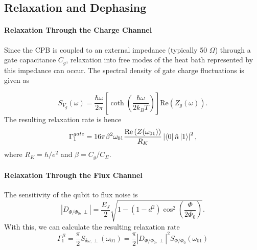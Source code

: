 \subsection{Relaxation and Dephasing}

\paragraph{Relaxation Through the Charge Channel}

Since the CPB is coupled to an external impedance (typically 50 $\Omega$) through a gate capacitance $C_g$, relaxation into free modes of the heat bath represented by this impedance can occur. The spectral density of gate charge fluctuations is given as

%
\begin{equation}
S_{V_g}(\omega) = \frac{\hbar\omega}{2\pi}\left[\coth{\left(\frac{\hbar \omega}{2 k_B T}\right)}\right]\mathrm{Re}\left(Z_g(\omega)\right).
\end{equation}
%
The resulting relaxation rate is hence
%
\begin{equation}
\Gamma_1^{gate} = 16\pi\beta^2 \omega_{01} \frac{\mathrm{Re}\left(Z(\omega_{01})\right)}{R_K}\left|\left< 0 \right|\hat{n}\left| 1 \right>\right|^2,
\end{equation}
%
where $R_K = h/e^2$ and $\beta=C_g/C_\Sigma$.

\paragraph{Relaxation Through the Flux Channel}

%
%
The sensitivity of the qubit to flux noise is
%
\begin{equation}
\left|D_{\Phi/\Phi_0,\perp}\right|  = \frac{E_J}{2}\sqrt{1-(1-d^2)\cos^2{\left(\frac{\Phi}{2\Phi_0}\right)}}.
\end{equation}
%
With this, we can calculate the resulting relaxation rate
%
\begin{equation}
\Gamma_1^{fl} = \frac{\pi}{2}S_{\delta \omega,\perp}(\omega_{01})=\frac{\pi}{2}\left|D_{\Phi/\Phi_0,\perp}\right|^2 S_{\Phi/\Phi_0}(\omega_{01})
\end{equation}
%

